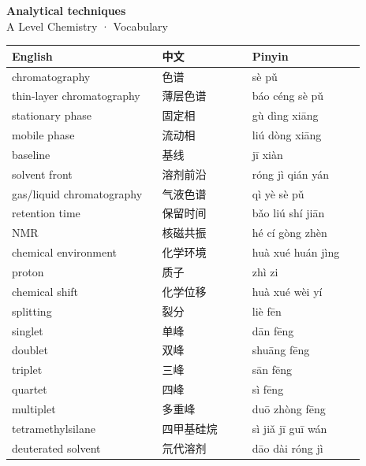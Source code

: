 \documentclass[11pt]{article}
\begin{document}
\begin{center}
  {\LARGE\bfseries Analytical techniques}\\[0.35em]
  {\large A Level Chemistry · Vocabulary}
\end{center}
\vspace{0.6em}

\begin{longtable}{@{}p{0.40\linewidth}p{0.24\linewidth}p{0.30\linewidth}@{}}
\toprule
\textbf{English} & \textbf{中文} & \textbf{Pinyin} \\
\midrule
\endhead
\bottomrule
\endlastfoot
chromatography & 色谱 & sè pǔ \\
thin-layer chromatography & 薄层色谱 & báo céng sè pǔ \\
stationary phase & 固定相 & gù dìng xiāng \\
mobile phase & 流动相 & liú dòng xiāng \\
baseline & 基线 & jī xiàn \\
solvent front & 溶剂前沿 & róng jì qián yán \\
gas/liquid chromatography & 气液色谱 & qì yè sè pǔ \\
retention time & 保留时间 & bǎo liú shí jiān \\
NMR & 核磁共振 & hé cí gòng zhèn \\
chemical environment & 化学环境 & huà xué huán jìng \\
proton & 质子 & zhì zi \\
chemical shift & 化学位移 & huà xué wèi yí \\
splitting & 裂分 & liè fēn \\
singlet & 单峰 & dān fēng \\
doublet & 双峰 & shuāng fēng \\
triplet & 三峰 & sān fēng \\
quartet & 四峰 & sì fēng \\
multiplet & 多重峰 & duō zhòng fēng \\
tetramethylsilane & 四甲基硅烷 & sì jiǎ jī guī wán \\
deuterated solvent & 氘代溶剂 & dāo dài róng jì \\
\end{longtable}
\end{document}
